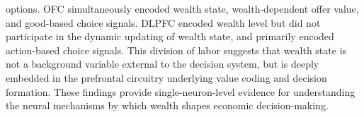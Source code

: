 options. OFC simultaneously encoded wealth state, wealth-dependent offer value, and good-based choice signals. DLPFC encoded wealth level but did not participate in the dynamic updating of wealth state, and primarily encoded action-based choice signals. This division of labor suggests that wealth state is not a background variable external to the decision system, but is deeply embedded in the prefrontal circuitry underlying value coding and decision formation. These findings provide single-neuron-level evidence for understanding the neural mechanisms by which wealth shapes economic decision-making.


\pagestyle{enfrontmatterstyle}%
\cleardoublepage\pagestyle{frontmatterstyle}%

